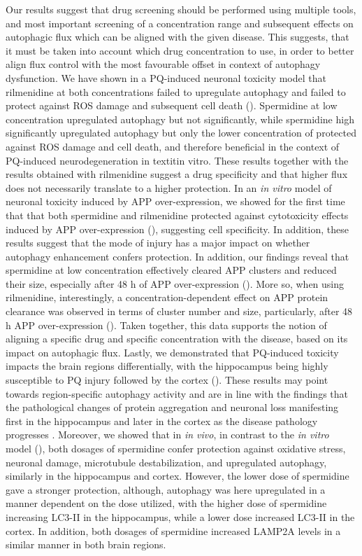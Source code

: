 Our results suggest that drug screening should be performed using multiple tools, and most important screening of a concentration range and subsequent effects on autophagic flux which can be aligned with the given disease. This suggests, that it must be taken into account which drug concentration to use, in order to better align flux control with the most favourable offset in context of autophagy dysfunction. We have shown in a PQ-induced neuronal toxicity model that rilmenidine at both concentrations failed to upregulate autophagy and failed to protect against ROS damage and subsequent cell death (). Spermidine at low concentration upregulated autophagy but not significantly, while spermidine high significantly upregulated autophagy but only the lower concentration of protected against ROS damage and cell death, and therefore beneficial in the context of PQ-induced neurodegeneration in textit{in vitro}. These results together with the results obtained with rilmenidine suggest a drug specificity and that higher flux does not necessarily translate to a higher protection. In an \textit{in vitro} model of neuronal toxicity induced by APP over-expression, we showed for the first time that that both spermidine and rilmenidine protected against cytotoxicity effects induced by APP over-expression (), suggesting cell specificity. In addition, these results suggest that the mode of injury has a major impact on whether autophagy enhancement  confers protection. In addition, our findings reveal that spermidine at low concentration effectively cleared APP clusters and reduced their size, especially after 48 h of APP over-expression (). More so, when using rilmenidine, interestingly, a concentration-dependent effect on APP protein clearance was observed in terms of  cluster number and size, particularly, after 48 h APP over-expression (). Taken together, this data supports the notion of  aligning a specific drug and specific concentration with the disease, based on its impact on autophagic flux. Lastly, we demonstrated that PQ-induced toxicity impacts the brain regions differentially, with the hippocampus being highly susceptible to PQ injury followed by the cortex (). These results may point towards region-specific autophagy activity and are in line with the findings that the pathological changes of protein aggregation and neuronal loss manifesting first in the hippocampus and later in the cortex as the disease pathology progresses \citep{Braak2004,Braak1998,Braak1991,Braak2012}. Moreover, we showed that in \textit{in vivo}, in contrast to the \textit{in vitro} model (), both dosages of spermidine confer protection against oxidative stress, neuronal damage, microtubule destabilization, and upregulated autophagy, similarly in the hippocampus and cortex. However, the lower dose of spermidine gave a stronger protection, although, autophagy was here upregulated in a manner dependent on the dose utilized, with the higher dose of spermidine increasing LC3-II in the hippocampus, while a lower dose increased LC3-II in the cortex. In addition, both dosages of spermidine increased LAMP2A levels in a similar manner in both brain regions. 

